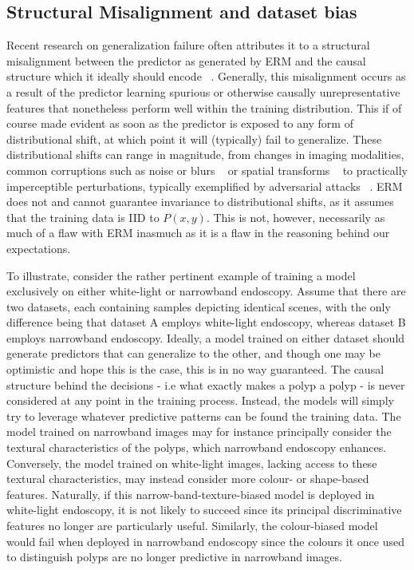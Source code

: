 	\subsection{Structural Misalignment and dataset bias}
	Recent research on generalization failure often attributes it to a structural misalignment between the predictor as generated by ERM and the causal structure which it ideally should encode ~\cite{adversarial_bugs_features,shortcut_learning,IRM, causality}. Generally, this misalignment occurs as a result of the predictor learning spurious or otherwise causally unrepresentative features that nonetheless perform well within the training distribution. This if of course made evident as soon as the predictor is exposed to any form of distributional shift, at which point it will (typically) fail to generalize. These distributional shifts can range in magnitude, from changes in imaging modalities, common corruptions such as noise or blurs ~\cite{benchmarking_robustness} or spatial transforms ~\cite{spatial_robustness} to practically imperceptible perturbations, typically exemplified by adversarial attacks ~\cite{adversarial_attacks}. ERM does not and cannot guarantee invariance to distributional shifts, as it assumes that the training data is IID to \(P(x,y)\). This is not, however, necessarily as much of a flaw with ERM inasmuch as it is a flaw in the reasoning behind our expectations. 
		
	To illustrate, consider the rather pertinent example of training a model exclusively on either white-light or narrowband endoscopy. Assume that there are two datasets, each containing samples depicting identical scenes, with the only difference being that dataset A employs white-light endoscopy, whereas dataset B employs narrowband endoscopy. Ideally, a model trained on either dataset should generate predictors that can generalize to the other, and though one may be optimistic and hope this is the case, this is in no way guaranteed. The causal structure behind the decisions - i.e what exactly makes a polyp a polyp - is never considered at any point in the training process. Instead, the models will simply try to leverage whatever predictive patterns can be found the training data. The model trained on narrowband images may for instance principally consider the textural characteristics of the polyps, which narrowband endoscopy enhances. Conversely, the model trained on white-light images, lacking access to these textural characteristics, may instead consider more colour- or shape-based features. Naturally, if this narrow-band-texture-biased model is deployed in white-light endoscopy, it is not likely to succeed since its principal discriminative features no longer are particularly useful. Similarly, the colour-biased model would fail when deployed in narrowband endoscopy since the colours it once used to distinguish polyps are no longer predictive in narrowband images.  

